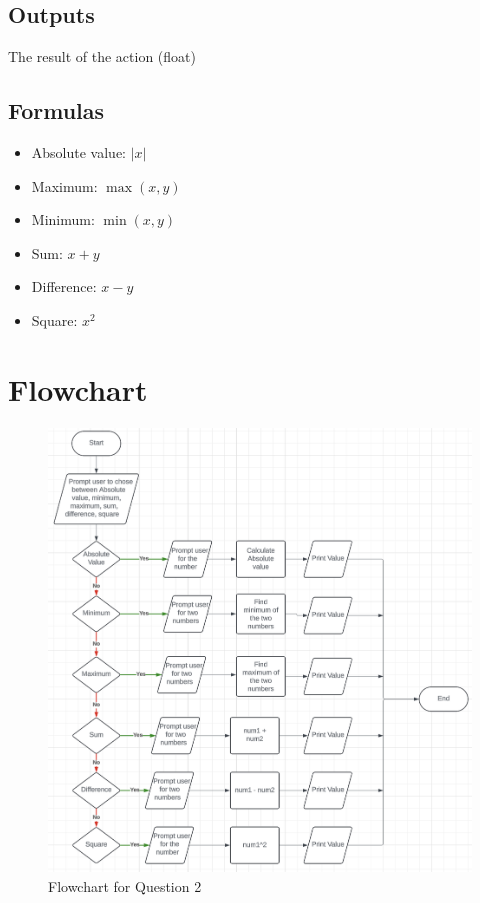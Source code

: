 \documentclass{article}
\begin{document}
\begin{flushleft}
  \subsection{Outputs}
  The result of the action (float)
  \subsection{Formulas}
  \begin{itemize}
    \item Absolute value: $|x|$
    \item Maximum: $\max(x, y)$
    \item Minimum: $\min(x, y)$
    \item Sum: $x + y$
    \item Difference: $x - y$
    \item Square: $x^2$
  \end{itemize}
  \newpage
  \section{Flowchart}
  \begin{figure}[!h]
    \begin{centering}
      \includegraphics[scale=0.55]{Q2_flowchart.png}
      \caption{Flowchart for Question 2}
    \end{centering}
  \end{figure}
  \newpage

\end{flushleft}
\end{document}
